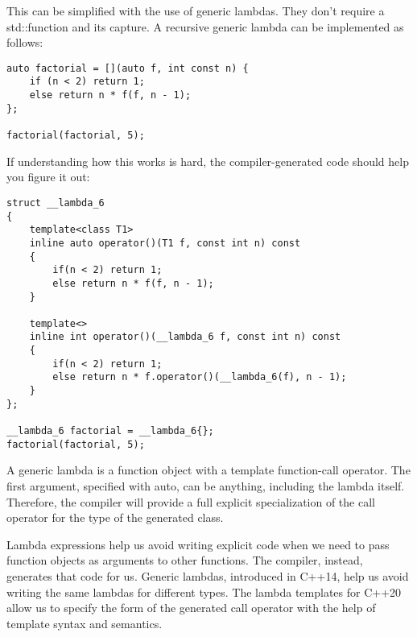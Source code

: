 This can be simplified with the use of generic lambdas. They don't require a std::function and its capture. A recursive generic lambda can be implemented as follows:

\begin{lstlisting}[style=styleCXX]
auto factorial = [](auto f, int const n) {
	if (n < 2) return 1;
	else return n * f(f, n - 1);
};

factorial(factorial, 5);
\end{lstlisting}

If understanding how this works is hard, the compiler-generated code should help you figure it out:

\begin{lstlisting}[style=styleCXX]
struct __lambda_6
{
	template<class T1>
	inline auto operator()(T1 f, const int n) const
	{
		if(n < 2) return 1;
		else return n * f(f, n - 1);
	}

	template<>
	inline int operator()(__lambda_6 f, const int n) const
	{
		if(n < 2) return 1;
		else return n * f.operator()(__lambda_6(f), n - 1);
	}
};

__lambda_6 factorial = __lambda_6{};
factorial(factorial, 5);
\end{lstlisting}

A generic lambda is a function object with a template function-call operator. The first argument, specified with auto, can be anything, including the lambda itself. Therefore, the compiler will provide a full explicit specialization of the call operator for the type of the generated class.

Lambda expressions help us avoid writing explicit code when we need to pass function objects as arguments to other functions. The compiler, instead, generates that code for us. Generic lambdas, introduced in C++14, help us avoid writing the same lambdas for different types. The lambda templates for C++20 allow us to specify the form of the generated call operator with the help of template syntax and semantics.


